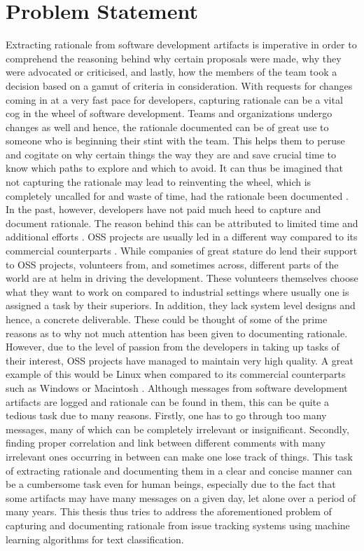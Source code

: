 \documentclass[a4paper,12pt,twoside]{report}
\begin{document}
\section{Problem Statement}
Extracting rationale from software development artifacts is imperative in order to comprehend the reasoning behind why certain proposals were made, why they were advocated or criticised, and lastly, how the members of the team took a decision based on a gamut of criteria in consideration. With requests for changes coming in at a very fast pace for developers, capturing rationale can be a vital cog in the wheel of software development. Teams and organizations undergo changes as well and hence, the rationale documented can be of great use to someone who is beginning their stint with the team. This helps them to peruse and cogitate on why certain things the way they are and save crucial time to know which paths to explore and which to avoid. It can thus be imagined that not capturing the rationale may lead to reinventing the wheel, which is completely uncalled for and waste of time, had the rationale been documented \cite{Bruegge2009}. In the past, however, developers have not paid much heed to capture and document rationale. The reason behind this can be attributed to limited time and additional efforts \cite{Dutoit2006}. OSS projects are usually led in a different way compared to its commercial counterparts \cite{mockus2002two}. While companies of great stature do lend their support to OSS projects, volunteers from, and sometimes across, different parts of the world are at helm in driving the development. These volunteers themselves choose what they want to work on compared to industrial settings where usually one is assigned a task by their superiors. In addition, they lack system level designs and hence, a concrete deliverable. These could be thought of some of the prime reasons as to why not much attention has been given to documenting rationale. However, due to the level of passion from the developers in taking up tasks of their interest, OSS projects have managed to maintain very high quality. A great example of this would be Linux when compared to its commercial counterparts such as Windows or Macintosh \cite{mockus2002two}. Although messages from software development artifacts are logged and rationale can be found in them, this can be quite a tedious task due to many reasons. Firstly, one has to go through too many messages, many of which can be completely irrelevant or insignificant. Secondly, finding proper correlation and link between different comments with many irrelevant ones occurring in between can make one lose track of things. This task of extracting rationale and documenting them in a clear and concise manner can be a cumbersome task even for human beings, especially due to the fact that some artifacts may have many messages on a given day, let alone over a period of many years. This thesis thus tries to address the aforementioned problem of capturing and documenting rationale from issue tracking systems using machine learning algorithms for text classification.
\end{document}
